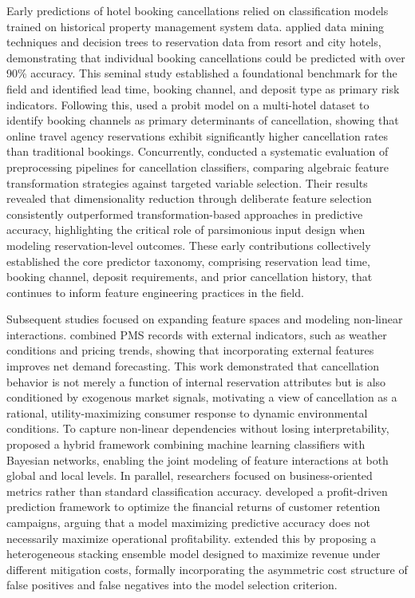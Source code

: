 \documentclass[pdflatex,iicol,sn-mathphys-ay]{sn-jnl}
\theoremstyle{thmstyleone}%
\theoremstyle{thmstyletwo}%
\theoremstyle{thmstylethree}%
\begin{document}
Early predictions of hotel booking cancellations relied on classification models trained on historical property management system data. \cite{antonio2017predicting} applied data mining techniques and decision trees to reservation data from resort and city hotels, demonstrating that individual booking cancellations could be predicted with over 90\% accuracy. This seminal study established a foundational benchmark for the field and identified lead time, booking channel, and deposit type as primary risk indicators. Following this, \cite{falk2018modelling} used a probit model on a multi-hotel dataset to identify booking channels as primary determinants of cancellation, showing that online travel agency reservations exhibit significantly higher cancellation rates than traditional bookings. Concurrently, \cite{satu2020performance} conducted a systematic evaluation of preprocessing pipelines for cancellation classifiers, comparing algebraic feature transformation strategies against targeted variable selection. Their results revealed that dimensionality reduction through deliberate feature selection consistently outperformed transformation-based approaches in predictive accuracy, highlighting the critical role of parsimonious input design when modeling reservation-level outcomes. These early contributions collectively established the core predictor taxonomy, comprising reservation lead time, booking channel, deposit requirements, and prior cancellation history, that continues to inform feature engineering practices in the field.

Subsequent studies focused on expanding feature spaces and modeling non-linear interactions. \cite{antonio2019big} combined PMS records with external indicators, such as weather conditions and pricing trends, showing that incorporating external features improves net demand forecasting. This work demonstrated that cancellation behavior is not merely a function of internal reservation attributes but is also conditioned by exogenous market signals, motivating a view of cancellation as a rational, utility-maximizing consumer response to dynamic environmental conditions. To capture non-linear dependencies without losing interpretability, \cite{chen2023prediction} proposed a hybrid framework combining machine learning classifiers with Bayesian networks, enabling the joint modeling of feature interactions at both global and local levels. In parallel, researchers focused on business-oriented metrics rather than standard classification accuracy. \cite{liu2023hospitality} developed a profit-driven prediction framework to optimize the financial returns of customer retention campaigns, arguing that a model maximizing predictive accuracy does not necessarily maximize operational profitability. \cite{liu2025explainable} extended this by proposing a heterogeneous stacking ensemble model designed to maximize revenue under different mitigation costs, formally incorporating the asymmetric cost structure of false positives and false negatives into the model selection criterion.
\end{document}
